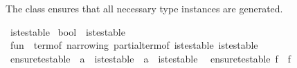 \begin{isabellebody}
\isadelimdocument
%
\endisadelimdocument
%
\isatagdocument
%
\isamarkuptrue%
%
\endisatagdocument
{\isafolddocument}%
%
\isadelimdocument
%
\endisadelimdocument
%
\begin{isamarkuptext}%
The class  ensures that all necessary type instances are generated.%
\end{isamarkuptext}\isamarkuptrue%
\isamarkupfalse%
\ is{\isacharunderscore}{\kern0pt}testable\isanewline
\isanewline
{}\isamarkupfalse%
\ bool\ {\isacharcolon}{\kern0pt}{\isacharcolon}{\kern0pt}\ is{\isacharunderscore}{\kern0pt}testable%
\isadelimproof
\ %
\endisadelimproof
%
\isatagproof
\isacommand{{\isachardot}{\kern0pt}{\isachardot}{\kern0pt}}\isamarkupfalse%
%
\endisatagproof
{\isafoldproof}%
%
\isadelimproof
%
\endisadelimproof
\isanewline
\isanewline
{}\isamarkupfalse%
\ {\isachardoublequoteopen}fun{\isachardoublequoteclose}\ {\isacharcolon}{\kern0pt}{\isacharcolon}{\kern0pt}\ {\isacharparenleft}{\kern0pt}{\isachardoublequoteopen}{\isacharbraceleft}{\kern0pt}term{\isacharunderscore}{\kern0pt}of{\isacharcomma}{\kern0pt}\ narrowing{\isacharcomma}{\kern0pt}\ partial{\isacharunderscore}{\kern0pt}term{\isacharunderscore}{\kern0pt}of{\isacharbraceright}{\kern0pt}{\isachardoublequoteclose}{\isacharcomma}{\kern0pt}\ is{\isacharunderscore}{\kern0pt}testable{\isacharparenright}{\kern0pt}\ is{\isacharunderscore}{\kern0pt}testable%
\isadelimproof
\ %
\endisadelimproof
%
\isatagproof
\isacommand{{\isachardot}{\kern0pt}{\isachardot}{\kern0pt}}\isamarkupfalse%
%
\endisatagproof
{\isafoldproof}%
%
\isadelimproof
%
\endisadelimproof
\isanewline
\isanewline
{}\isamarkupfalse%
\ ensure{\isacharunderscore}{\kern0pt}testable\ {\isacharcolon}{\kern0pt}{\isacharcolon}{\kern0pt}\ {\isachardoublequoteopen}{\isacharprime}{\kern0pt}a\ {\isacharcolon}{\kern0pt}{\isacharcolon}{\kern0pt}\ is{\isacharunderscore}{\kern0pt}testable\ {\isacharequal}{\kern0pt}{\isachargreater}{\kern0pt}\ {\isacharprime}{\kern0pt}a\ {\isacharcolon}{\kern0pt}{\isacharcolon}{\kern0pt}\ is{\isacharunderscore}{\kern0pt}testable{\isachardoublequoteclose}\isanewline
{}\isanewline
\ \ {\isachardoublequoteopen}ensure{\isacharunderscore}{\kern0pt}testable\ f\ {\isacharequal}{\kern0pt}\ f{\isachardoublequoteclose}%
\isadelimdocument
%
\endisadelimdocument
%
\isatagdocument
%
\end{isabellebody}
